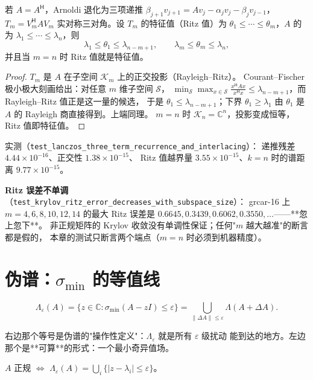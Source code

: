 \begin{theorem}
\label{thm:lanczos}
若 $A=A^{\mathsf H}$，Arnoldi 退化为三项递推
$\beta_{j+1}v_{j+1}=Av_j-\alpha_jv_j-\beta_jv_{j-1}$，
$T_m=V_m^{\mathsf H}AV_m$ 实对称三对角。设 $T_m$ 的特征值（Ritz 值）为
$\theta_1\le\cdots\le\theta_m$，$A$ 的为 $\lambda_1\le\cdots\le\lambda_n$，则
\[
  \lambda_1\le\theta_1\le\lambda_{n-m+1},\qquad
  \lambda_m\le\theta_m\le\lambda_n ,
\]
并且当 $m=n$ 时 Ritz 值就是特征值。
\end{theorem}

\begin{proof}
$T_m$ 是 $A$ 在子空间 $\mathcal{K}_m$ 上的正交投影（Rayleigh--Ritz）。
Courant--Fischer 极小极大刻画给出：对任意 $m$ 维子空间 $\mathcal{S}$，
$\min_{\mathcal{S}}\max_{x\in\mathcal{S}}\frac{x^{\mathsf H}Ax}{x^{\mathsf H}x}
\le\lambda_{n-m+1}$，而 Rayleigh--Ritz 值正是这一量的候选，
于是 $\theta_1\le\lambda_{n-m+1}$；下界 $\theta_1\ge\lambda_1$ 由
$\theta_1$ 是 $A$ 的 Rayleigh 商直接得到。上端同理。
$m=n$ 时 $\mathcal{K}_n=\mathbb{C}^n$，投影变成恒等，Ritz 值即特征值。
\end{proof}

实测（\texttt{test\_lanczos\_three\_term\_recurrence\_and\_interlacing}）：
递推残差 $4.44\times10^{-16}$、正交性 $1.38\times10^{-15}$、
Ritz 值越界量 $3.55\times10^{-15}$、$k=n$ 时的谱距离 $9.77\times10^{-15}$。

\textbf{Ritz 误差不单调}（\texttt{test\_krylov\_ritz\_error\_decreases\_with\_subspace\_size}）：
grcar-16 上 $m=4,6,8,10,12,14$ 的最大 Ritz 误差是
$0.6645,0.3439,0.6062,0.3550,\dots$——**忽上忽下**。
非正规矩阵的 Krylov 收敛没有单调性保证；任何"$m$ 越大越准"的断言都是假的，
本章的测试只断言两个端点（$m=n$ 时必须到机器精度）。

\section{伪谱：$\sigma_{\min}$ 的等值线}
\label{sec:pseudo}

\begin{definition}[$\varepsilon$-伪谱]
\[
  \Lambda_\varepsilon(A)=\{z\in\mathbb{C}:\sigma_{\min}(A-zI)\le\varepsilon\}
  =\bigcup_{\|\Delta A\|\le\varepsilon}\Lambda(A+\Delta A) .
\]
\end{definition}

右边那个等号是伪谱的"操作性定义"：$\Lambda_\varepsilon$ 就是所有 $\varepsilon$ 级扰动
能到达的地方。左边那个是**可算**的形式：一个最小奇异值场。

\begin{theorem}
\label{thm:normal-ps}
$A$ 正规 $\iff$ $\Lambda_\varepsilon(A)=\bigcup_i\{|z-\lambda_i|\le\varepsilon\}$。
\end{theorem}

